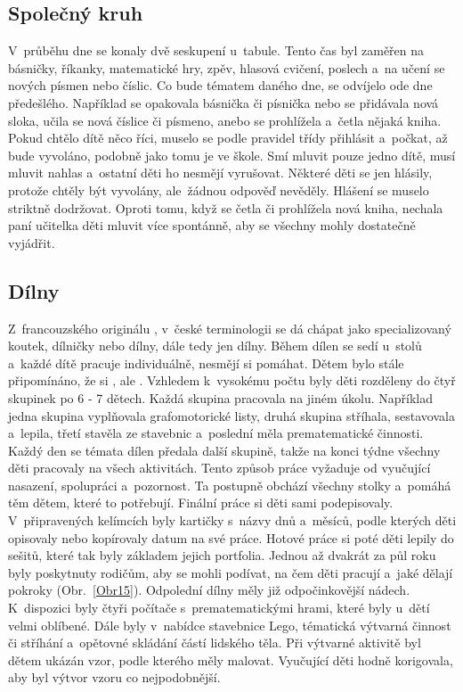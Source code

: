 			\subsection{Společný kruh}
			V průběhu dne se konaly dvě seskupení u~tabule. Tento čas byl zaměřen na básničky, říkanky, matematické hry, zpěv, hlasová cvičení, poslech a~na učení se nových písmen nebo číslic. Co bude tématem daného dne, se odvíjelo ode dne předešlého. Například se opakovala básnička či písnička nebo se přidávala nová sloka, učila se nová číslice či písmeno, anebo se prohlížela a~četla nějaká kniha. Pokud chtělo dítě něco říci, muselo se podle pravidel třídy přihlásit a~počkat, až bude vyvoláno, podobně jako tomu je ve škole. Smí mluvit pouze jedno dítě, musí mluvit nahlas a~ostatní děti ho nesmějí vyrušovat. Některé děti se jen hlásily, protože chtěly být vyvolány, ale žádnou odpověď nevěděly. Hlášení se muselo striktně dodržovat. Oproti tomu, když se četla či prohlížela nová kniha, nechala paní učitelka děti mluvit více spontánně, aby se všechny mohly dostatečně vyjádřit.

		\subsection{Dílny}
		\label{dilny}
			Z~francouzského originálu , v~české terminologii se dá chápat jako specializovaný koutek, dílničky nebo dílny, dále tedy jen dílny. 
			Během dílen se sedí u~stolů a~každé dítě pracuje individuálně, nesmějí si pomáhat. Dětem bylo stále připomínáno, že si , ale . Vzhledem k~vysokému počtu byly děti rozděleny do čtyř skupinek po 6 - 7 dětech. Každá skupina pracovala na jiném úkolu. Například jedna skupina vyplňovala grafomotorické listy, druhá skupina stříhala, sestavovala a~lepila, třetí stavěla ze stavebnic a~poslední měla prematematické činnosti. Každý den se témata dílen předala další skupině, takže na konci týdne všechny děti pracovaly na všech aktivitách. Tento způsob práce vyžaduje od vyučující nasazení, spolupráci a~pozornost. Ta postupně obchází všechny stolky a~pomáhá těm dětem, které to potřebují. Finální práce si děti sami podepisovaly. V~připravených kelímcích byly kartičky s~názvy dnů a~měsíců, podle kterých děti opisovaly nebo kopírovaly datum na své práce. Hotové práce si poté děti lepily do sešitů, které tak byly základem jejich portfolia. Jednou až dvakrát za půl roku byly poskytnuty rodičům, aby se mohli podívat, na čem děti pracují a~jaké dělají pokroky (Obr.~\ref{Obr15}). Odpolední dílny měly již odpočinkovější nádech. K~dispozici byly čtyři počítače s~prematematickými hrami, které byly u~dětí velmi oblíbené. Dále byly v~nabídce stavebnice Lego, tématická výtvarná činnost či stříhání a~opětovné skládání částí lidského těla. Při výtvarné aktivitě byl dětem ukázán vzor, podle kterého měly malovat. Vyučující děti hodně korigovala, aby byl výtvor vzoru co nejpodobnější.


